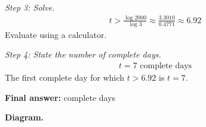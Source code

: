 \documentclass[11pt]{article}
\begin{document}
\textit{Step 3: Solve.}
\[\begin{gathered}
t > \frac{\log 2000}{\log 3} \approx \frac{3.3010}{0.4771} \approx 6.92
\end{gathered}\]
Evaluate using a calculator.

\textit{Step 4: State the number of complete days.}
\[\begin{gathered}
t = 7 \text{ complete days}
\end{gathered}\]
The first complete day for which \( t > 6.92 \) is \( t = 7 \).

\begin{answerbox}
\textbf{Final answer:} complete days
\end{answerbox}
\textbf{Diagram.}

\begin{center}
\end{center}
\end{document}
